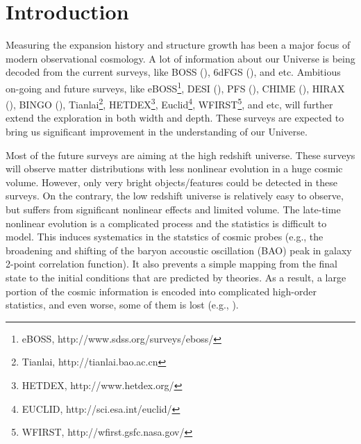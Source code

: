 \documentclass[iop]{emulateapj}
\begin{document}


\section{Introduction}
\label{sec:introduction}

Measuring the expansion history and structure growth has been a major focus of modern observational cosmology.
A lot of information about our Universe is being decoded from the current surveys, like BOSS 
(\cite{BOSS}),
6dFGS (\cite{6dFGS-DR3}), and etc.
Ambitious on-going and future surveys, like eBOSS\footnote{eBOSS, http://www.sdss.org/surveys/eboss/}, DESI 
(\cite{DESIsci}), PFS 
(\cite{PFScosmology}), CHIME
(\cite{Bandura14}), 
HIRAX (\cite{HIRAX16}),
BINGO (\cite{BINGO16}),
Tianlai\footnote{Tianlai, http://tianlai.bao.ac.cn},
HETDEX\footnote{HETDEX, http://www.hetdex.org/}, Euclid\footnote{EUCLID, http://sci.esa.int/euclid/}, WFIRST\footnote{WFIRST, http://wfirst.gsfc.nasa.gov/}, and etc,
 will further extend the exploration in both width and depth.
These surveys are expected to bring us significant improvement in the understanding of our Universe.


Most of the future surveys are aiming at the high redshift universe.
These surveys will observe matter distributions with less nonlinear evolution in a huge cosmic volume.
However, only very bright objects/features could be detected in these surveys.
On the contrary, the low redshift universe is relatively easy to observe, but suffers from significant nonlinear effects and limited volume.
The late-time nonlinear evolution is a complicated process and the statistics is difficult to model.
This induces systematics in the statstics of cosmic probes (e.g., the broadening and shifting of the baryon accoustic oscillation (BAO) peak in galaxy 2-point correlation function).
It also prevents a simple mapping from the final state to the initial conditions that are predicted by theories.
As a result, a large portion of the cosmic information is encoded into complicated high-order statistics, and even worse, some of them is lost (e.g., \cite{Rimes05,Rimes06,Neyrinck06,Carron12a}).
\end{document}

